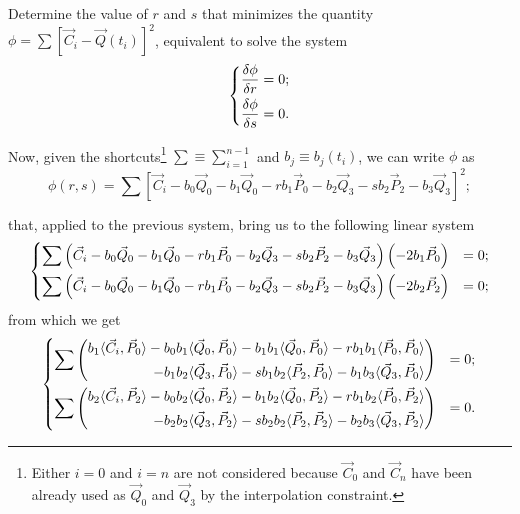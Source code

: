 \documentclass{scrartcl}
\newcommand\V[1]{\vec{#1}}
\newcommand\SP[2]{\langle #1, #2 \rangle}
\begin{document}
Determine the value of $r$ and $s$ that minimizes the quantity
$\phi = \sum \left[ \V{C}_i - \V{Q}(t_i) \right]^2$, equivalent to
solve the system
\begin{equation*}
\begin{dcases}
\frac{\delta\phi}{\delta r} = 0;\\
\frac{\delta\phi}{\delta s} = 0.
\end{dcases}
\end{equation*}

Now, given the shortcuts\footnote{Either $i = 0$ and $i = n$ are not
considered because $\V{C}_0$ and $\V{C}_n$ have been already used as
$\V{Q}_0$ and $\V{Q}_3$ by the interpolation constraint.} $\sum \equiv
\sum_{i=1}^{n-1}$ and $b_j \equiv b_j(t_i)$, we can write $\phi$ as
\begin{equation*}
    \phi(r, s) = \sum \left[ \V{C}_i - b_0 \V{Q}_0 - b_1 \V{Q}_0 -
    r b_1 \V{P}_0 - b_2 \V{Q}_3 - s b_2 \V{P}_2 - b_3 \V{Q}_3 \right]^2;
\end{equation*}

that, applied to the previous system, bring us to the following linear system
\begin{equation*}
\begin{dcases}
    \sum \left(
	\V{C}_i - b_0 \V{Q}_0 - b_1 \V{Q}_0 - r b_1 \V{P}_0 -
	b_2 \V{Q}_3 - s b_2 \V{P}_2 - b_3 \V{Q}_3
    \right) \left( -2 b_1 \V{P}_0 \right) &= 0; \\
    \sum \left(
	\V{C}_i - b_0 \V{Q}_0 - b_1 \V{Q}_0 - r b_1 \V{P}_0 -
	b_2 \V{Q}_3 - s b_2 \V{P}_2 - b_3 \V{Q}_3
    \right) \left( -2 b_2 \V{P}_2 \right) &= 0; \\
\end{dcases}
\end{equation*}
from which we get
\begin{equation*}
\begin{dcases}
    \sum \left(
    \begin{split}
	b_1       \SP{\V{C}_i}{\V{P}_0} -
	b_0 b_1   \SP{\V{Q}_0}{\V{P}_0} -
	b_1 b_1   \SP{\V{Q}_0}{\V{P}_0} -
	r b_1 b_1 \SP{\V{P}_0}{\V{P}_0} \\ -
	b_1 b_2   \SP{\V{Q}_3}{\V{P}_0} -
	s b_1 b_2 \SP{\V{P}_2}{\V{P}_0} -
	b_1 b_3   \SP{\V{Q}_3}{\V{P}_0}
    \end{split}
    \right) &= 0; \\
    \sum \left(
    \begin{split}
	b_2       \SP{\V{C}_i}{\V{P}_2} -
	b_0 b_2   \SP{\V{Q}_0}{\V{P}_2} -
	b_1 b_2   \SP{\V{Q}_0}{\V{P}_2} -
	r b_1 b_2 \SP{\V{P}_0}{\V{P}_2} \\ -
	b_2 b_2   \SP{\V{Q}_3}{\V{P}_2} -
	s b_2 b_2 \SP{\V{P}_2}{\V{P}_2} -
	b_2 b_3   \SP{\V{Q}_3}{\V{P}_2}
    \end{split}
    \right) &= 0. \\
\end{dcases}
\end{equation*}
\end{document}
